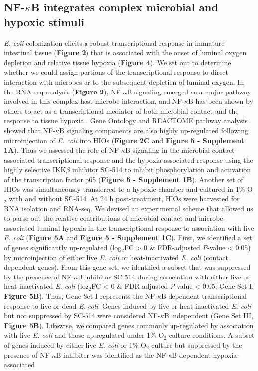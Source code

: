 \documentclass[9pt,lineo]{elife}
\begin{document}
\subsection*{{\bfseries\sffamily } NF-\(\kappa\)B integrates complex microbial and hypoxic stimuli}
\label{sec:orgheadline7}
\emph{E. coli} colonization elicits a robust transcriptional response in immature intestinal tissue (\textbf{Figure 2}) that is associated with the onset of luminal oxygen depletion and relative tissue hypoxia (\textbf{Figure 4}). We set out to determine whether we could assign portions of the transcriptional response to direct interaction with microbes or to the subsequent depletion of luminal oxygen. In the RNA-seq analysis (\textbf{Figure 2}), NF-\(\kappa\)B signaling emerged as a major pathway involved in this complex host-microbe interaction, and NF-\(\kappa\)B has been shown by others to act as a transcriptional mediator of both microbial contact and the response to tissue hypoxia  \citep{Rius:2008,Gilmore:2006,Wullaert:2011}. Gene Ontology and REACTOME pathway analysis showed that NF-\(\kappa\)B signaling components are also highly up-regulated following microinjection of \emph{E. coli} into HIOs (\textbf{Figure 2C} and \textbf{Figure 5 - Supplement 1A}).  Thus we assessed the role of NF-\(\kappa\)B signaling in the microbial contact-associated transcriptional response and the hypoxia-associated response using the highly selective IKK\(\beta\) inhibitor SC-514 \citep{Kishore:2003,Litvak:2009} to inhibit phosphorylation and activation of the transcription factor p65 (\textbf{Figure 5 - Supplement 1B}). Another set of HIOs was simultaneously transferred to a hypoxic chamber and cultured in 1\% O\(_{\text{2}}\) with and without SC-514. At 24 h post-treatment, HIOs were harvested for RNA isolation and RNA-seq. We devised an experimental scheme that allowed us to parse out the relative contributions of microbial contact and microbe-associated luminal hypoxia in the transcriptional response to association with live \emph{E. coli} (\textbf{Figure 5A} and \textbf{Figure 5 - Supplement 1C}). First, we identified a set of genes significantly up-regulated (log\(_{\text{2}}\)FC > 0 \& FDR-adjusted \emph{P}-value < 0.05) by microinjection of either live \emph{E. coli} or heat-inactivated \emph{E. coli} (contact dependent genes). From this gene set, we identified a subset that was suppressed by the presence of NF-\(\kappa\)B inhibitor SC-514 during association with either live or heat-inactivated \emph{E. coli} (log\(_{\text{2}}\)FC < 0 \& FDR-adjusted \emph{P}-value < 0.05; Gene Set I, \textbf{Figure 5B}). Thus, Gene Set I represents the NF-\(\kappa\)B dependent transcriptional response to live or dead \emph{E. coli}. Genes induced by live or heat-inactivated \emph{E. coli} but not suppressed by SC-514 were considered NF-\(\kappa\)B independent (Gene Set III, \textbf{Figure 5B}). Likewise, we compared genes commonly up-regulated by association with live \emph{E. coli} and those up-regulated under 1\% O\(_{\text{2}}\) culture conditions. A subset of genes induced by either live \emph{E. coli} or 1\% O\(_{\text{2}}\) culture but suppressed by the presence of NF-\(\kappa\)B inhibitor was identified as the NF-\(\kappa\)B-dependent hypoxia-associated 
\end{document}
